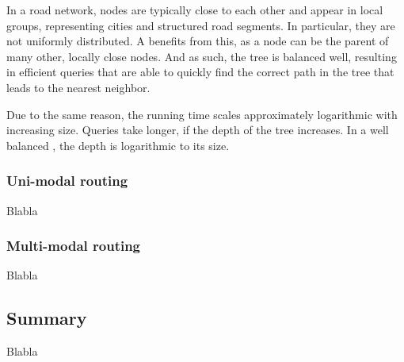 	In a road network, nodes are typically close to each other and appear in local groups, representing cities and structured
	road segments. In particular, they are not uniformly distributed. A \coverTree benefits from this, as a node can be the
	parent of many other, locally close nodes. And as such, the tree is balanced well, resulting in efficient queries
	that are able to quickly find the correct path in the tree that leads to the nearest neighbor.
	
	Due to the same reason, the running time scales approximately logarithmic with increasing size. Queries take longer, if the
	depth of the tree increases. In a well balanced \coverTree, the depth is logarithmic to its size.

\subsubsection{Uni-modal routing}
	Blabla

\subsubsection{Multi-modal routing}
	Blabla

\subsection{Summary}
	Blabla
